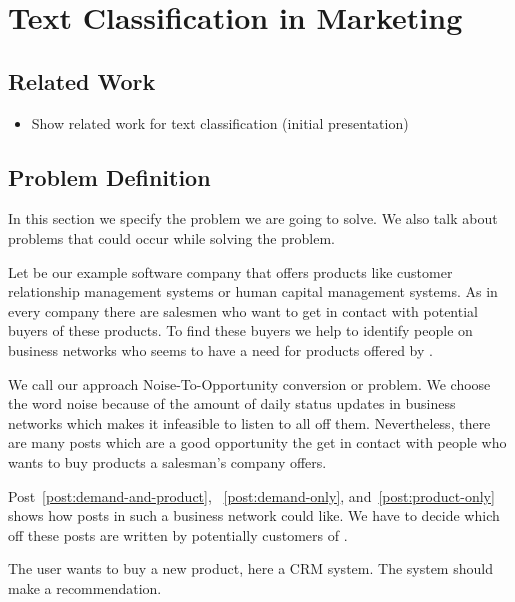 
\section{Text Classification in Marketing}
\label{sec:background}

\subsection{Related Work}

\begin{itemize}
	\item Show related work for text classification (initial presentation)
\end{itemize}

\subsection{Problem Definition}
\label{sec:background-problem}

In this section we specify the problem we are going to solve. We also talk about problems that could occur while solving the problem. 

Let \acme be our example software company that offers products like customer relationship management systems or human capital management systems. 
As in every company there are salesmen who want to get in contact with potential buyers of these products. 
To find these buyers we help \acme to identify people on business networks who seems to have a need for products offered by \acme.

We call our approach Noise-To-Opportunity conversion or \nto problem.
We choose the word noise because of the amount of daily status updates in business networks which makes it infeasible to listen to all off them.
Nevertheless, there are many posts which are a good opportunity the get in contact with people who wants to buy products a salesman's company offers. 

Post~\ref{post:demand-and-product}, ~\ref{post:demand-only}, and~\ref{post:product-only} shows how posts in such a business network could like. 
We have to decide which off these posts are written by potentially customers of \acme. 

\begin{post}
	\centering
	\caption{The user wants to buy a new product, here a CRM system. The system should make a recommendation.}
	\label{post:demand-and-product}
\end{post}

